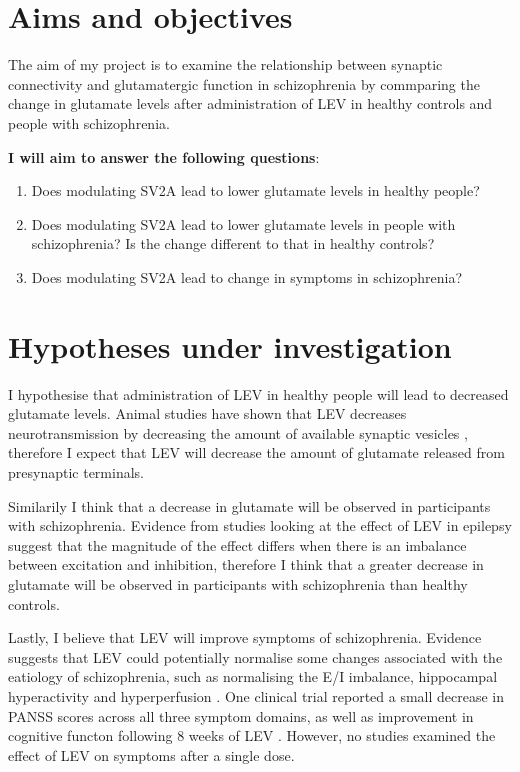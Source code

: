 \documentclass[
  letterpaper,
  DIV=11,
  numbers=noendperiod]{scrartcl}
\providecommand{\tightlist}{%
  \setlength{\itemsep}{0pt}\setlength{\parskip}{0pt}}\usepackage{longtable,booktabs,array}
\begin{document}
\section{Aims and objectives}\label{aims-and-objectives}

The aim of my project is to examine the relationship between synaptic
connectivity and glutamatergic function in schizophrenia by commparing
the change in glutamate levels after administration of LEV in healthy
controls and people with schizophrenia.

\textbf{I will aim to answer the following questions}:

\begin{enumerate}
\def\labelenumi{\arabic{enumi}.}
\tightlist
\item
  Does modulating SV2A lead to lower glutamate levels in healthy people?
\item
  Does modulating SV2A lead to lower glutamate levels in people with
  schizophrenia? Is the change different to that in healthy controls?
\item
  Does modulating SV2A lead to change in symptoms in schizophrenia?
\end{enumerate}

\section{Hypotheses under
investigation}\label{hypotheses-under-investigation}

I hypothesise that administration of LEV in healthy people will lead to
decreased glutamate levels. Animal studies have shown that LEV decreases
neurotransmission by decreasing the amount of available synaptic
vesicles \autocite{meehan_new_2011}, therefore I expect that LEV will
decrease the amount of glutamate released from presynaptic terminals.

Similarily I think that a decrease in glutamate will be observed in
participants with schizophrenia. Evidence from studies looking at the
effect of LEV in epilepsy suggest that the magnitude of the effect
differs when there is an imbalance between excitation and inhibition,
therefore I think that a greater decrease in glutamate will be observed
in participants with schizophrenia than healthy controls.

Lastly, I believe that LEV will improve symptoms of schizophrenia.
Evidence suggests that LEV could potentially normalise some changes
associated with the eatiology of schizophrenia, such as normalising the
E/I imbalance, hippocampal hyperactivity
\autocite{roeske_modulation_2023} and hyperperfusion
\autocite{goff_levetiracetam_2020}. One clinical trial reported a small
decrease in PANSS scores across all three symptom domains, as well as
improvement in cognitive functon following 8 weeks of LEV
\autocite{behdani_can_2022}. However, no studies examined the effect of
LEV on symptoms after a single dose.
\end{document}

